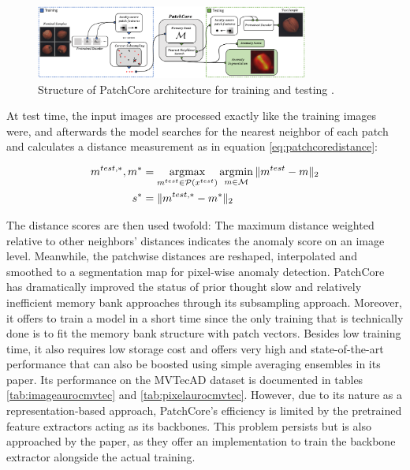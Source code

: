 \begin{figure}[H]
\centering
 \includegraphics[width=0.8\textwidth]{figures/pathcore_architecture.png}
 \caption{Structure of PatchCore architecture for training and testing \cite{patchCore2022}.}
 \label{fig:patchcorearchitecture}
\end{figure}

At test time, the input images are processed exactly like the training images were, and afterwards the model searches for the nearest neighbor of each patch and calculates a distance measurement as 
in equation \ref{eq:patchcoredistance}:

\begin{equation}
\label{eq:patchcoredistance}
\begin{split}
m^{test, *}, m^{*} &= \operatorname*{argmax}_{m^{test} \in \mathcal{P}(x^{test})} \operatorname*{argmin}_{m \in \mathcal{M}} \| m^{test} - m \|_{2} \\
s^{*} &= \| m^{test, *} - m^{*} \|_{2}
\end{split}
\end{equation}

The distance scores are then used twofold: The maximum distance weighted relative to other neighbors' distances indicates the anomaly score on an image level. Meanwhile, the patchwise distances are reshaped, 
interpolated and smoothed to a segmentation map for pixel-wise anomaly detection.
\newline
PatchCore has dramatically improved the status of prior thought slow and relatively inefficient memory bank approaches through its subsampling approach. Moreover, it offers to train a model in a short time 
since the only training that is technically done is to fit the memory bank structure with patch vectors. Besides low training time, it also requires low storage cost and offers very high and state-of-the-art 
performance that can also be boosted using simple averaging ensembles in its paper. Its performance on the MVTecAD dataset \cite{MVTEC_Bergmann_2021} is documented in tables \ref{tab:imageaurocmvtec} and \ref{tab:pixelaurocmvtec}. However, due to its nature as a representation-based approach, PatchCore's 
efficiency is limited by the pretrained feature extractors acting as its backbones. This problem persists but is also approached by the paper, as they offer an implementation to train the backbone 
extractor alongside the actual training.


